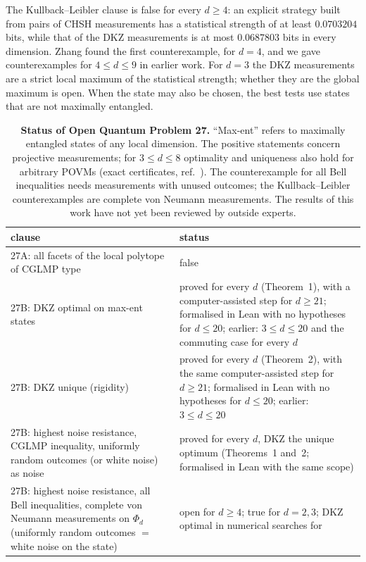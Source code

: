 \documentclass[11pt]{article}
\begin{document}
The Kullback--Leibler clause\cite{vanDam2005} is false for every $d\ge4$: an explicit strategy built from pairs of CHSH
measurements has a statistical strength of at least $0.0703204$ bits, while that of the DKZ measurements is at most
$0.0687803$ bits in every dimension. Zhang found the first counterexample, for $d=4$\cite{Zhang2026}, and we gave
counterexamples for $4\le d\le9$ in earlier work\cite{repoCGLMP}. For $d=3$ the DKZ measurements are a strict local
maximum of the statistical strength; whether they are the global maximum is open. When the state may also be chosen,
the best tests use states that are not maximally entangled\cite{AGG2005}.

\begin{table}[t]
\centering\small
\caption{\textbf{Status of Open Quantum Problem 27.} ``Max-ent'' refers to maximally entangled states of any local
dimension. The positive statements concern projective measurements; for $3\le d\le8$ optimality and uniqueness also hold
for arbitrary POVMs (exact certificates, ref.~). The counterexample for all Bell inequalities needs
measurements with unused outcomes; the Kullback--Leibler counterexamples are complete von Neumann measurements. The
results of this work have not yet been reviewed by outside experts.}
\label{tab:status}
\begin{tabular}{>{\raggedright\arraybackslash}p{5.3cm}>{\raggedright\arraybackslash}p{9.6cm}}
\toprule
clause & status\\
\midrule
27A: all facets of the local polytope of CGLMP type & false\cite{BGP2010}\\
27B: DKZ optimal on max-ent states & proved for every $d$ (Theorem~1), with a computer-assisted step for $d\ge21$;
formalised in Lean with no hypotheses for $d\le20$; earlier: $3\le d\le20$ and the commuting case for every
$d$\cite{repoCGLMP,classical2026}\\
27B: DKZ unique (rigidity) & proved for every $d$ (Theorem~2), with the same computer-assisted step for $d\ge21$;
formalised in Lean with no hypotheses for $d\le20$; earlier: $3\le d\le20$\cite{repoCGLMP}\\
27B: highest noise resistance, CGLMP inequality, uniformly random outcomes (or white noise) as noise & proved for every
$d$, DKZ the unique optimum (Theorems~1 and~2; formalised in Lean with the same scope)\\
27B: highest noise resistance, all Bell inequalities, complete von Neumann measurements on $\Phi_d$ (uniformly random
outcomes $=$ white noise on the state) & open for $d\ge4$; true for $d=2,3$; DKZ optimal in numerical searches for

\end{tabular}
\end{table}
\end{document}
